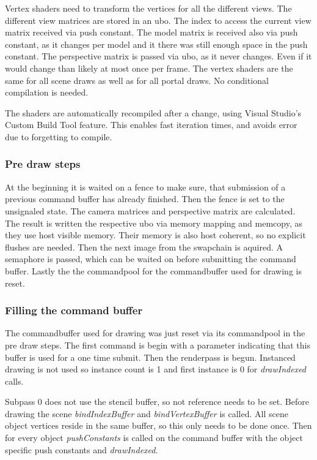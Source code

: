 Vertex shaders need to transform the vertices for all the different views. The different view matrices are stored in an \gls{ubo}. The index to access the current view matrix received via push constant. The model matrix is received also via push constant, as it changes per model and it there was still enough space in the push constant. The perspective matrix is passed via \gls{ubo}, as it never changes. Even if it would change than likely at most once per frame. The vertex shaders are the same for all scene draws as well as for all portal draws. No conditional compilation is needed.


The shaders are automatically recompiled after a change, using Visual Studio's Custom Build Tool feature. This enables fast iteration times, and avoids error due to forgetting to compile.

\subsubsection{Pre draw steps}

At the beginning it is waited on a fence to make sure, that submission of a previous command buffer has already finished. Then the fence is set to the unsignaled state. The camera matrices and perspective matrix are calculated. The result is written the respective \gls{ubo} via memory mapping and memcopy, as they use host visible memory. Their memory is also host coherent, so no explicit flushes are needed.
Then the next image from the swapchain is aquired. A semaphore is passed, which can be waited on before submitting the command buffer.
Lastly the the commandpool for the commandbuffer used for drawing is reset.

\subsubsection{Filling the command buffer}
The commandbuffer used for drawing was just reset via its commandpool in the pre draw steps. The first command is begin with a parameter indicating that this buffer is used for a one time submit. Then the renderpass is begun. Instanced drawing is not used so instance count is 1 and first instance is 0 for \textit{drawIndexed} calls.

Subpass 0 does not use the stencil buffer, so not reference needs to be set. Before drawing the scene \textit{bindIndexBuffer} and \textit{bindVertexBuffer} is called. All scene object vertices reside in the same buffer, so this only needs to be done once. Then for every object \textit{pushConstants} is called on the command buffer with the object specific push constants and \textit{drawIndexed}. 

